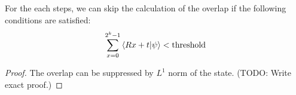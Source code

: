 \documentclass[\main/main]{subfiles}
\begin{document}
\begin{proposition}
    For the each steps, we can skip the calculation of the overlap if the following conditions are satisfied:
    \begin{equation*}
        \sum_{x=0}^{2^k-1} \braket{Rx+t}{\psi} < \mathrm{threshold}
    \end{equation*}
\end{proposition}
\begin{proof}
    The overlap can be suppressed by $L^1$ norm of the state.
    (TODO: Write exact proof.)
\end{proof}

\end{document}
